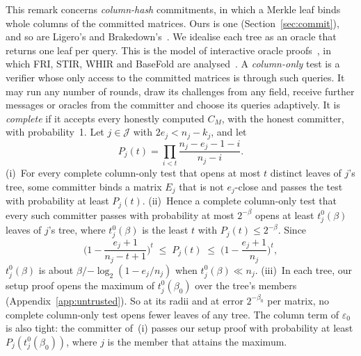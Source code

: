 \begin{remark}
\label{rem:forced}
This remark concerns \emph{column-hash} commitments, in which a Merkle leaf binds whole columns of
the committed matrices. Ours is one (Section~\ref{sec:commit}), and so are Ligero's and
Brakedown's~\cite{ligero,brakedown}. We idealise each tree as an oracle that returns one leaf per
query. This is the model of interactive oracle proofs~\cite{bcs16}, in which FRI, STIR, WHIR and
BaseFold are analysed~\cite{fri2018,stir,whir,basefold}. A \emph{column-only} test is a verifier
whose only access to the committed matrices is through such queries. It may run any number of
rounds, draw its challenges from any field, receive further messages or oracles from the committer
and choose its queries adaptively. It is \emph{complete} if it accepts every honestly computed
$C_M$, with the honest committer, with probability~1. Let $j\in\mathcal J$ with $2e_j<n_j-k_j$, and let
\[
  P_j(t)=\prod_{i<t}\frac{n_j-e_j-1-i}{n_j-i}.
\]
(i)~For every complete column-only test that opens at most $t$ distinct leaves of $j$'s tree, some
committer binds a matrix $E_j$ that is not $e_j$-close and passes the test with probability at least
$P_j(t)$.
(ii)~Hence a complete column-only test that every such committer passes with probability at most
$2^{-\beta}$ opens at least $t^0_j(\beta)$ leaves of $j$'s tree, where $t^0_j(\beta)$ is the least $t$ with
$P_j(t)\le2^{-\beta}$. Since
\[
  \Big(1-\frac{e_j+1}{n_j-t+1}\Big)^{t}\;\le\;P_j(t)\;\le\;\Big(1-\frac{e_j+1}{n_j}\Big)^{t},
\]
$t^0_j(\beta)$ is about $\beta/{-\log_2(1-e_j/n_j)}$ when $t^0_j(\beta)\ll n_j$.
(iii)~In each tree, our setup proof opens the maximum of $t^0_j(\beta_0)$ over the tree's members
(Appendix~\ref{app:untrusted}). So at its radii and at error $2^{-\beta_0}$ per matrix, no complete
column-only test opens fewer leaves of any tree. The column term of $\varepsilon_0$ is also tight:
the committer of~(i) passes our setup proof with probability at least $P_j(t^0_j(\beta_0))$, where
$j$ is the member that attains the maximum.
\end{remark}

